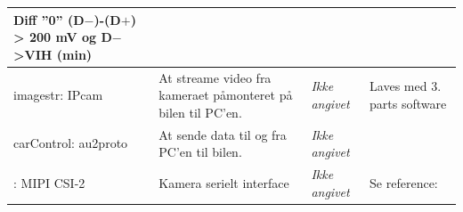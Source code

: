 \begin{table}[h]
\begin{tabularx}{\textwidth}{|l|Z|Z|Z|}
		Diff ''0''						\newline
		(D$-$)-(D$+$) > 200 mV			\newline
		og D$-$>VIH (min)				\newline
	\\ \hline	
	
imagestr: IPcam
	& At streame video fra kameraet påmonteret på bilen til PC'en.
	& \textit{Ikke angivet} 
	& Laves med 3. parts software	
	\\ \hline

carControl: au2proto
	& At sende data til og fra PC'en til bilen.
	& \textit{Ikke angivet} 
	& ~
	\\ \hline
	
: MIPI CSI-2
	& Kamera serielt interface
	& \textit{Ikke angivet} 
	& Se reference: \cite{lib:MIPICSI-2}
	\\ \hline
	\end{tabularx}
\end{table}
